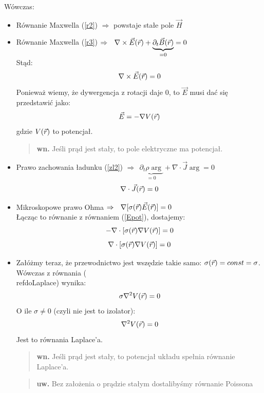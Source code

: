 \begin{enumerate}
Wówczas:\begin{itemize}
\item Równanie Maxwella (\ref{r2}) $\Rightarrow$ powstaje stałe pole $\vec{H}$
\item Równanie Maxwella (\ref{r3}) $\Rightarrow ~~ \nabla\times\vec{E}(\vec{r})+\underbrace{\partial_t\vec{B}(\vec{r})}_{=0}=0$ \\
Stąd:
\begin{equation} \nabla\times\vec{E}(\vec{r})=0 \end{equation}
Ponieważ wiemy, że dywergencja z rotacji daje 0, to $\vec{E}$ musi dać się przedstawić jako:
\begin{equation} \vec{E}=-\nabla V(\vec{r}) \label{Epot}\end{equation}
gdzie $V(\vec{r})$ to potencjał.
\begin{verse} \textbf{wn.} Jeśli prąd jest stały, to pole elektryczne ma potencjał. \end{verse} 
\item Prawo zachowania ładunku (\ref{zl2}) $\Rightarrow ~~ \underbrace{\partial_t\rho\arg}_{=0}+\nabla\cdot\vec{J}\arg=0 $
\begin{equation} \nabla\cdot\vec{J}({\vec{r}})=0 \end{equation}
\item Mikroskopowe prawo Ohma $\Rightarrow ~~ \nabla[\sigma(\vec{r})\vec{E}(\vec{r})]=0$ \\
Łącząc to równanie z równaniem (\ref{Epot}), dostajemy: \\ 
\begin{equation} -\nabla \cdot[\sigma(\vec{r}) \nabla V(\vec{r})] =0  \nonumber \end{equation}
\begin{equation} \nabla \cdot[\sigma(\vec{r}) \nabla V(\vec{r})] =0 \label{doLaplace} \end{equation}
\item Załóżmy teraz, że przewodnictwo jest wszędzie takie samo: $\sigma(\vec{r})=const=\sigma $.\\
Wówczas z równania (\\ref{doLaplace}) wynika:
\begin{equation} \sigma \nabla ^2 V(\vec{r}) =0 \end{equation}
O ile $\sigma \neq 0 $ (czyli nie jest to izolator):
\begin{equation} \nabla^2 V(\vec{r})=0\end{equation}
Jest to równania Laplace'a.
\begin{verse} \textbf{wn.} Jeśli prąd jest stały, to potencjał układu spełnia równanie Laplace'a. \end{verse}
\begin{verse} \textbf{uw.} Bez założenia o prądzie stałym dostalibyśmy równanie Poissona \end{verse}
\end{itemize}


\end{enumerate}
